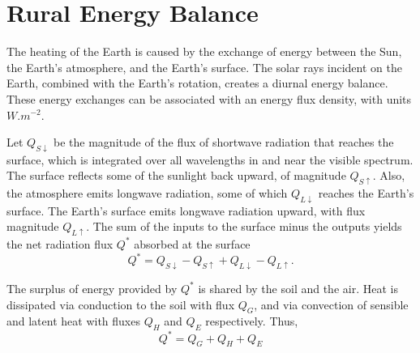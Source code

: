 \section{Rural Energy Balance}
	The heating of the Earth is caused by the exchange of energy between the Sun, the Earth's atmosphere, and the Earth's surface.
	The solar rays incident on the Earth, combined with the Earth's rotation, creates a diurnal energy balance.
	These energy exchanges can be associated with an energy flux density, with units $\si{W.m^{-2}}$.
	
	Let $Q_{S\downarrow}$ be the magnitude of the flux of shortwave radiation that reaches the surface, which is integrated over all wavelengths in and near	the visible spectrum.
	The surface reflects some of the sunlight back upward, of magnitude $Q_{S\uparrow}$.
	Also, the atmosphere emits longwave radiation, some of which
	$Q_{L\downarrow}$ reaches the Earth’s surface.
	The Earth’s surface emits longwave radiation upward, with flux magnitude $Q_{L\uparrow}$. 
	The sum of the inputs to the surface minus the outputs yields the net radiation flux $Q^*$ absorbed at the
	surface
	\begin{equation}
		Q^* = Q_{S\downarrow} - Q_{S\uparrow} + Q_{L\downarrow} - Q_{L\uparrow}.
	\end{equation}
	
	The surplus of energy provided by $Q^*$ is shared by the soil and the air.
	Heat is dissipated via conduction to the soil with flux $Q_G$,
		and via convection of sensible and latent heat with fluxes $Q_H$ and $Q_E$ respectively. 
	Thus,
	\begin{equation}
		Q^* = Q_G + Q_H + Q_E
	\end{equation}

